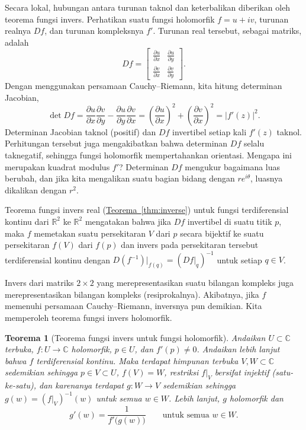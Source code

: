 \documentclass[12pt,openany]{book}
\newcommand{\babs}[1]{\bigl\lvert {#1} \bigr\rvert}
\newcommand{\C}{{\mathbb{C}}}
\newcommand{\R}{{\mathbb{R}}}
\theoremstyle{plain}
\newtheorem{thm}{Teorema}[section]
\theoremstyle{remark}
\theoremstyle{definition}
\theoremstyle{exercise}
\theoremstyle{example}
\newcommand{\thmref}[1]{\hyperref[#1]{Teorema~\ref*{#1}}}
\begin{document}
Secara lokal, hubungan antara turunan taknol dan keterbalikan diberikan oleh
teorema fungsi invers.  Perhatikan suatu fungsi holomorfik
$f = u+iv$, turunan realnya $Df$, dan turunan kompleksnya $f'$.
Turunan real tersebut, sebagai matriks, adalah
\begin{equation*}
Df =
\begin{bmatrix}
\frac{\partial u}{\partial x} & \frac{\partial u}{\partial y} \\[5pt]
\frac{\partial v}{\partial x} & \frac{\partial v}{\partial y}
\end{bmatrix} .
\end{equation*}
Dengan menggunakan persamaan Cauchy--Riemann, kita hitung determinan Jacobian,
\begin{equation*}
\det Df =
\frac{\partial u}{\partial x}
\frac{\partial v}{\partial y} -
\frac{\partial u}{\partial y} 
\frac{\partial v}{\partial x}
=
{\left(\frac{\partial u}{\partial x}\right)}^2
+
{\left(\frac{\partial v}{\partial x}\right)}^2
=
\babs{f'(z)}^2 .
\end{equation*}
Determinan Jacobian taknol (positif) dan $Df$ invertibel
setiap kali $f'(z)$ taknol.
Perhitungan tersebut juga mengakibatkan
bahwa determinan
$Df$ selalu taknegatif, sehingga fungsi holomorfik mempertahankan orientasi.
Mengapa ini merupakan kuadrat modulus $f'$? Determinan $Df$
mengukur bagaimana luas berubah, dan jika kita mengalikan suatu bagian bidang
dengan $r e^{i\theta}$, luasnya dikalikan dengan $r^2$.

Teorema fungsi invers real (\thmref{thm:inverse})
untuk fungsi terdiferensial kontinu
dari $\R^2$ ke $\R^2$
mengatakan bahwa jika $Df$ invertibel di suatu titik $p$, maka $f$ memetakan suatu
persekitaran $V$ dari $p$ secara bijektif ke suatu persekitaran $f(V)$
dari $f(p)$ dan invers pada persekitaran tersebut terdiferensial
kontinu dengan $D(f^{-1})|_{f(q)} = (Df|_q)^{-1}$ untuk setiap $q \in V$.

Invers dari matriks $2 \times 2$ yang merepresentasikan suatu bilangan kompleks juga
merepresentasikan bilangan kompleks (resiprokalnya).  Akibatnya, jika $f$
memenuhi persamaan Cauchy--Riemann, inversnya pun demikian.
Kita memperoleh teorema fungsi invers holomorfik.

\begin{thm}[Teorema fungsi invers untuk fungsi holomorfik]
\label{thm:inversehol}
Andaikan $U \subset \C$ terbuka, $f \colon U \to \C$ holomorfik,
$p \in U$, dan $f'(p) \neq 0$.  Andaikan lebih lanjut bahwa $f$ terdiferensial
kontinu.
Maka terdapat himpunan terbuka $V, W \subset \C$ sedemikian sehingga
$p \in V \subset U$, $f(V) = W$, restriksi $f|_V$ bersifat injektif
(satu-ke-satu),
dan karenanya terdapat $g \colon W \to V$ sedemikian sehingga
$g(w) = (f|_V)^{-1}(w)$ untuk semua $w \in W$.
Lebih lanjut, $g$ holomorfik dan
\begin{equation*}
g'(w) = \frac{1}{f'\bigl(g(w)\bigr)} \qquad \text{untuk semua $w \in W$}.
\end{equation*}
\end{thm}
\end{document}
